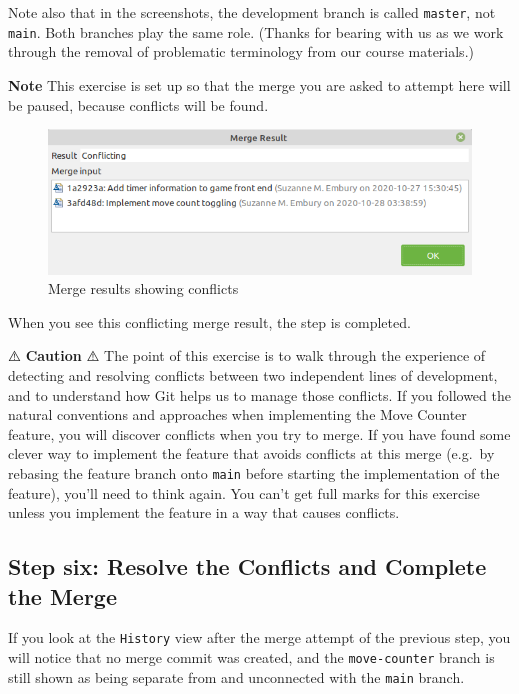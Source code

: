 \documentclass[
]{book}
\begin{document}
Note also that in the screenshots, the development branch is called \texttt{master}, not \texttt{main}. Both branches play the same role. (Thanks for bearing with us as we work through the removal of problematic terminology from our course materials.)

\textbf{Note} This exercise is set up so that the merge you are asked to attempt here will be paused, because conflicts will be found.

\begin{figure}

{\centering \includegraphics[width=0.5\linewidth]{images/mergeResultShowingConflicts} 

}

\caption{Merge results showing conflicts}\label{fig:mergeResultShowingConflicts-fig}
\end{figure}

When you see this conflicting merge result, the step is completed.

⚠️ \textbf{Caution} ⚠️
The point of this exercise is to walk through the experience of detecting and resolving conflicts between two independent lines of development, and to understand how Git helps us to manage those conflicts. If you followed the natural conventions and approaches when implementing the Move Counter feature, you will discover conflicts when you try to merge. If you have found some clever way to implement the feature that avoids conflicts at this merge (e.g.~by rebasing the feature branch onto \texttt{main} before starting the implementation of the feature), you'll need to think again. You can't get full marks for this exercise unless you implement the feature in a way that causes conflicts.

\hypertarget{resolveconfcomp}{%
\subsection{Step six: Resolve the Conflicts and Complete the Merge}\label{resolveconfcomp}}

If you look at the \texttt{History} view after the merge attempt of the previous step, you will notice that no merge commit was created, and the \texttt{move-counter} branch is still shown as being separate from and unconnected with the \texttt{main} branch.
\end{document}
